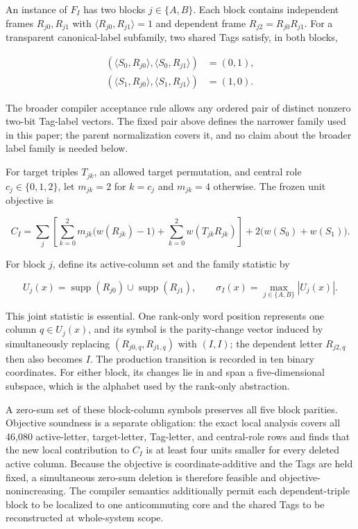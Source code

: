 \documentclass[11pt]{article}
\begin{document}
An instance of \(F_I\) has two blocks \(j\in\{A,B\}\). Each block contains independent frames \(R_{j0},R_{j1}\) with \(\langle R_{j0},R_{j1}\rangle=1\) and dependent frame \(R_{j2}=R_{j0}R_{j1}\). For a transparent canonical-label subfamily, two shared Tags satisfy, in both blocks,

\[
\begin{aligned}
(\langle S_0,R_{j0}\rangle,\langle S_0,R_{j1}\rangle)&=(0,1),\\
(\langle S_1,R_{j0}\rangle,\langle S_1,R_{j1}\rangle)&=(1,0).
\end{aligned}
\]

The broader compiler acceptance rule allows any ordered pair of distinct nonzero two-bit Tag-label vectors. The fixed pair above defines the narrower family used in this paper; the parent normalization covers it, and no claim about the broader label family is needed below.

For target triples \(T_{jk}\), an allowed target permutation, and central role \(c_j\in\{0,1,2\}\), let \(m_{jk}=2\) for \(k=c_j\) and \(m_{jk}=4\) otherwise. The frozen unit objective is

\[
C_I=
\sum_{j}\left[
\sum_{k=0}^2m_{jk}\bigl(w(R_{jk})-1\bigr)
+\sum_{k=0}^2w(T_{jk}R_{jk})
\right]
+2\bigl(w(S_0)+w(S_1)\bigr).
\]

For block \(j\), define its active-column set and the family statistic by

\[
U_j(x)=\operatorname{supp}(R_{j0})\cup\operatorname{supp}(R_{j1}),
\qquad
\sigma_I(x)=\max_{j\in\{A,B\}}|U_j(x)|.
\]

This joint statistic is essential. One rank-only word position represents one column \(q\in U_j(x)\), and its symbol is the parity-change vector induced by simultaneously replacing \((R_{j0,q},R_{j1,q})\) with \((I,I)\); the dependent letter \(R_{j2,q}\) then also becomes \(I\). The production transition is recorded in ten binary coordinates. For either block, its changes lie in and span a five-dimensional subspace, which is the alphabet used by the rank-only abstraction.

A zero-sum set of these block-column symbols preserves all five block parities. Objective soundness is a separate obligation: the exact local analysis covers all 46,080 active-letter, target-letter, Tag-letter, and central-role rows and finds that the new local contribution to \(C_I\) is at least four units smaller for every deleted active column. Because the objective is coordinate-additive and the Tags are held fixed, a simultaneous zero-sum deletion is therefore feasible and objective-nonincreasing. The compiler semantics additionally permit each dependent-triple block to be localized to one anticommuting core and the shared Tags to be reconstructed at whole-system scope.
\end{document}
